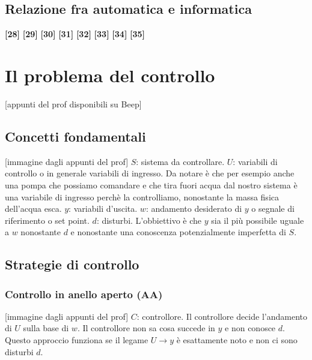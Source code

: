 \subsection{Relazione fra automatica e informatica}
\textbf{[28]}\;
\newline\textbf{[29]}\;
\newline\textbf{[30]}\;
\newline\textbf{[31]}\;
\newline\textbf{[32]}\;
\newline\textbf{[33]}\;
\newline\textbf{[34]}\;
\newline\textbf{[35]}
\section{Il problema del controllo}
[appunti del prof disponibili su Beep]\newline
\subsection{Concetti fondamentali}
[immagine dagli appunti del prof]\newline
$S$: sistema da controllare. \newline
$U$: variabili di controllo o in generale variabili di ingresso. Da notare è che per esempio anche una pompa che possiamo comandare e che tira fuori acqua dal nostro sistema è una variabile di ingresso perchè la controlliamo, nonostante la massa fisica dell'acqua esca.
$y$: variabili d'uscita.\newline
$w$: andamento desiderato di $y$ o segnale di riferimento o set point.\newline
$d$: disturbi.\newline
L'obbiettivo è che $y$ sia il più possibile uguale a $w$ nonostante $d$ e nonostante una conoscenza potenzialmente imperfetta di $S$.
\subsection{Strategie di controllo}
\subsubsection{Controllo in anello aperto (AA)}
[immagine dagli appunti del prof]\newline
$C$: controllore.\newline
Il controllore decide l'andamento di $U$ sulla base di $w$. Il controllore non sa cosa succede in $y$ e non conosce $d$.\newline
Questo approccio funziona se il legame $U \rightarrow y$ è esattamente noto e non ci sono disturbi $d$.\newline
